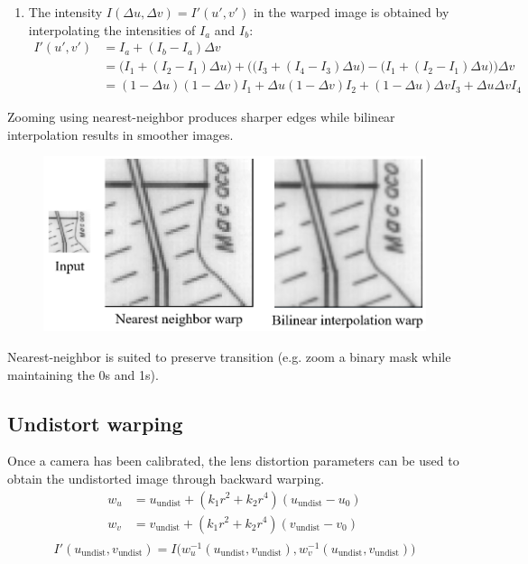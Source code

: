 \begin{description}
\begin{enumerate}
            \item The intensity $I(\Delta u, \Delta v) = I'(u', v')$ in the warped image is obtained by interpolating the intensities of $I_a$ and $I_b$:
                \[ 
                    \begin{split}
                        I'(u', v') &= I_a + (I_b - I_a) \Delta v \\
                        &= \Big( I_1 + (I_2 - I_1) \Delta u \Big) + \Big( \big( I_3 + (I_4 - I_3) \Delta u \big) - \big( I_1 + (I_2 - I_1) \Delta u \big) \Big) \Delta v \\
                        &= (1-\Delta u)(1 - \Delta v) I_1 + \Delta u (1-\Delta v) I_2 + (1-\Delta u) \Delta v I_3 + \Delta u \Delta v I_4
                    \end{split}
                \]
        \end{enumerate}

        \begin{remark}[Zoom]
            Zooming using nearest-neighbor produces sharper edges while bilinear interpolation results in smoother images.
            \begin{figure}[H]
                \centering
                \includegraphics[width=0.5\linewidth]{./img/warp_zoom.png}
            \end{figure}
        \end{remark}

        \begin{remark}
            Nearest-neighbor is suited to preserve transition (e.g. zoom a binary mask while maintaining the 0s and 1s).
        \end{remark}
\end{description}


\subsection{Undistort warping}

Once a camera has been calibrated, the lens distortion parameters can be used to obtain the undistorted image through backward warping.
\[
    \begin{split}
        w_u &= u_\text{undist} + (k_1 r^2 + k_2 r^4)(u_\text{undist} - u_0) \\
        w_v &= v_\text{undist} + (k_1 r^2 + k_2 r^4)(v_\text{undist} - v_0) \\
    \end{split}
\]
\[
    I'(u_\text{undist}, v_\text{undist}) = I\big( w^{-1}_u(u_\text{undist}, v_\text{undist}), w^{-1}_v(u_\text{undist}, v_\text{undist}) \big)
\]

